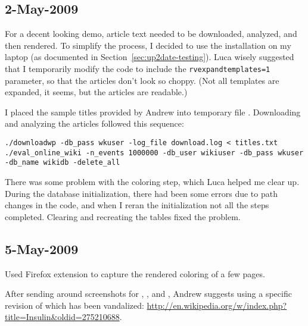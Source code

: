 \subsection{2-May-2009}

\label{sec:genewiki-eval}

For a decent looking demo, article text needed to be downloaded,
analyzed, and then rendered.
To simplify the process, I decided to use the \mediawiki installation
on my laptop (as documented in Section~\ref{sec:up2date-testing}).
Luca wisely suggested that I temporarily modify the code to include
the \texttt{rvexpandtemplates=1} parameter, so that the articles
don't look so choppy.
(Not all templates are expanded, it seems, but the articles
are readable.)

I placed the sample titles provided by Andrew into temporary
file .
Downloading and analyzing the articles followed this sequence:
\begin{verbatim}
./downloadwp -db_pass wkuser -log_file download.log < titles.txt 
./eval_online_wiki -n_events 1000000 -db_user wikiuser -db_pass wkuser -db_name wikidb -delete_all
\end{verbatim}

There was some problem with the coloring step, which Luca helped me clear up.
During the database initialization, there had been some errors due
to path changes in the code, and when I reran the initialization
not all the steps completed.
Clearing and recreating the \wikitrust tables fixed the problem.

\subsection{5-May-2009}

Used Firefox extension  to capture
the rendered coloring of a few pages.

After sending around screenshots for ,
, and ,
Andrew suggests using a specific revision of 
which has been vandalized:
\url{http://en.wikipedia.org/w/index.php?title=Insulin&oldid=275210688}.

